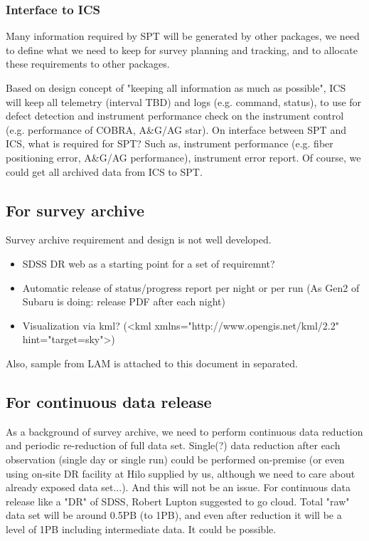 \documentclass[a4paper,notitlepage]{article}
\begin{document}
\subsubsection{Interface to ICS}

Many information required by SPT will be generated by other packages, we need 
to define what we need to keep for survey planning and tracking, and to 
allocate these requirements to other packages. 

Based on design concept of "keeping all information as much as possible", 
ICS will keep all telemetry (interval TBD) and logs (e.g. command, status), 
to use for defect detection and instrument performance check on the 
instrument control (e.g. performance of COBRA, A\&G/AG star).
On interface between SPT and ICS, what is required for SPT? Such as, instrument 
performance (e.g. fiber positioning error, A\&G/AG performance), instrument 
error report. Of course, we could get all archived data from ICS to SPT. 

\subsection{For survey archive}

Survey archive requirement and design is not well developed.

\begin{itemize}
  \item SDSS DR web as a starting point for a set of requiremnt?
  \item Automatic release of status/progress report per night or per run
    (As Gen2 of Subaru is doing: release PDF after each night)
  \item Visualization via kml? 
    (<kml xmlns="http://www.opengis.net/kml/2.2" hint="target=sky">)
\end{itemize}

Also, sample from LAM is attached to this document in separated. 

\subsection{For continuous data release}

As a background of survey archive, we need to perform continuous data 
reduction and periodic re-reduction of full data set.
Single(?) data reduction after each observation (single day or single run) 
could be performed on-premise (or even using on-site DR facility at Hilo 
supplied by us, although we need to care about already exposed data set...). 
And this will not be an issue.
For continuous data release like a "DR" of SDSS, Robert Lupton suggested to 
go cloud. Total "raw" data set will be around 0.5PB (to 1PB), and even after 
reduction it will be a level of 1PB including intermediate data.
It could be possible.
\end{document}
